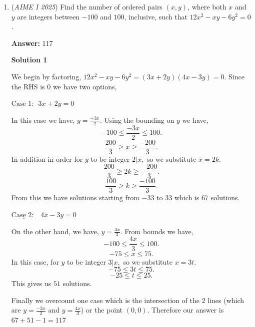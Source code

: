 \begin{enumerate}
 Summing these up, we get $252+504+1260= 2\boxed{016}$




\textbf{Solution 5}

Let $c, v, s$ be chocolate, vanilla, and strawberry respectively. We will also use the notation $(s, v, c)$ to denote the number of chocolate, vanilla, and strawberry respectively. We have this condition, $c>v>s$. Now, we can list out the cases since there wont be a lot. First, we have: 
 \[(1,2,6) \Longrightarrow \binom{9}{1} \cdot \binom{8}{2} = 252\]. Second, we have: 
 \[(1,3,5) \Longrightarrow \binom{9}{1} \cdot \binom{8}{3} = 504\], and last, we have: 
 \[(2,3,4) \Longrightarrow \binom{9}{2} \cdot \binom{7}{3} = 1260\]. Summing them we get $2016$, then, we take $\mod 1000$, to get $\boxed{016}$

 -jb2015007

 


	\item (\textit{AIME I 2025}) Find the number of ordered pairs $(x,y)$, where both $x$ and $y$ are integers between $-100$ and $100$, inclusive, such that $12x^2-xy-6y^2=0$.


 
 \textbf{Answer: }117



\textbf{Solution 1}

We begin by factoring, $12x^2-xy-6y^2=(3x+2y)(4x-3y)=0.$ Since the RHS is $0$ we have two options,

 $\underline{\text{Case 1:}}\text{ } 3x+2y = 0$

 In this case we have, $y=\frac{-3x}{2}.$ Using the bounding on $y$ we have, 
 \[-100\le\frac{-3x}{2}\le 100.\] 
 \[\frac{200}{3}\ge x \ge \frac{-200}{3}.\]In addition in order for $y$ to be integer $2 | x,$ so we substitute $x=2k.$ 
 \[\frac{200}{3}\ge 2k \ge \frac{-200}{3}.\] 
 \[\frac{100}{3}\ge k \ge \frac{-100}{3}.\] From this we have solutions starting from $-33$ to $33$ which is $67$ solutions.

 $\underline{\text{Case 2: }}\text{ } 4x-3y = 0$

 On the other hand, we have, $y=\frac{4x}{3}.$ From bounds we have, 
 \[-100\le\frac{4x}{3}\le 100.\] 
 \[-75 \le x \le 75.\]In this case, for $y$ to be integer $3 | x,$ so we substitute $x=3t.$ 
 \[-75 \le 3t \le 75.\] 
 \[-25 \le t \le 25.\] This gives us $51$ solutions.

 Finally we overcount one case which is the intersection of the $2$ lines (which are $y=\frac{-3x}{2}$ and $y=\frac{4x}{3}$) or the point $(0,0).$ Therefore our answer is $67+51-1=\boxed{117}$


\end{enumerate}
